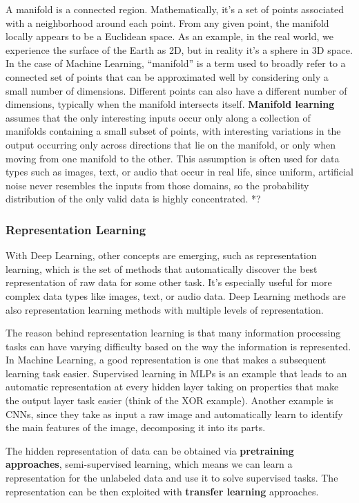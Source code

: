 A manifold is a connected region. Mathematically, it's a set of points associated with a neighborhood around each point. From any given point, the manifold locally appears to be a Euclidean space. As an example, in the real world, we experience the surface of the Earth as 2D, but in reality it's a sphere in 3D space. In the case of Machine Learning, ``manifold'' is a term used to broadly refer to a connected set of points that can be approximated well by considering only a small number of dimensions. Different points can also have a different number of dimensions, typically when the manifold intersects itself. \textbf{Manifold learning} assumes that the only interesting inputs occur only along a collection of manifolds containing a small subset of points, with interesting variations in the output occurring only across directions that lie on the manifold, or only when moving from one manifold to the other. This assumption is often used for data types such as images, text, or audio that occur in real life, since uniform, artificial noise never resembles the inputs from those domains, so the probability distribution of the only valid data is highly concentrated. *?

\subsubsection{Representation Learning}

With Deep Learning, other concepts are emerging, such as representation learning, which is the set of methods that automatically discover the best representation of raw data for some other task. It's especially useful for more complex data types like images, text, or audio data. Deep Learning methods are also representation learning methods with multiple levels of representation.

The reason behind representation learning is that many information processing tasks can have varying difficulty based on the way the information is represented. In Machine Learning, a good representation is one that makes a subsequent learning task easier. Supervised learning in MLPs is an example that leads to an automatic representation at every hidden layer taking on properties that make the output layer task easier (think of the XOR example). Another example is CNNs, since they take as input a raw image and automatically learn to identify the main features of the image, decomposing it into its parts.

The hidden representation of data can be obtained via \textbf{pretraining approaches}, semi-supervised learning, which means we can learn a representation for the unlabeled data and use it to solve supervised tasks. The representation can be then exploited with \textbf{transfer learning} approaches.

